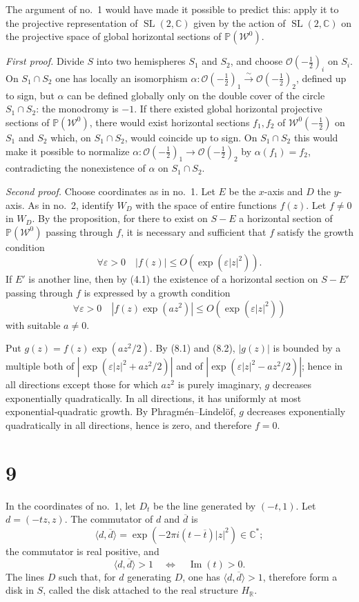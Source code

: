 \documentclass[11pt]{article}
\newcommand{\C}{\mathbb C}
\newcommand{\R}{\mathbb R}
\newcommand{\cO}{\mathcal O}
\newcommand{\cW}{\mathcal W}
\newcommand{\half}{\tfrac12}
\DeclareMathOperator{\SL}{SL}
\begin{document}
The argument of no.~1 would have made it possible to predict this: apply it to the projective representation of $\SL(2,\C)$ given by the action of $\SL(2,\C)$ on the projective space of global horizontal sections of $\mathbb P(\cW^0)$.

\emph{First proof.} Divide $S$ into two hemispheres $S_1$ and $S_2$, and choose $\cO(-\half)_i$ on $S_i$. On $S_1\cap S_2$ one has locally an isomorphism $\alpha:\cO(-\half)_1\xrightarrow{\sim}\cO(-\half)_2$, defined up to sign, but $\alpha$ can be defined globally only on the double cover of the circle $S_1\cap S_2$: the monodromy is $-1$. If there existed global horizontal projective sections of $\mathbb P(\cW^0)$, there would exist horizontal sections $f_1,f_2$ of $\cW^0(-\half)$ on $S_1$ and $S_2$ which, on $S_1\cap S_2$, would coincide up to sign. On $S_1\cap S_2$ this would make it possible to normalize $\alpha:\cO(-\half)_1\to\cO(-\half)_2$ by $\alpha(f_1)=f_2$, contradicting the nonexistence of $\alpha$ on $S_1\cap S_2$.

\emph{Second proof.} Choose coordinates as in no.~1. Let $E$ be the $x$-axis and $D$ the $y$-axis. As in no.~2, identify $W_D$ with the space of entire functions $f(z)$. Let $f\ne0$ in $W_D$. By the proposition, for there to exist on $S-E$ a horizontal section of $\mathbb P(\cW^0)$ passing through $f$, it is necessary and sufficient that $f$ satisfy the growth condition
\begin{equation}\tag{8.1}
\forall\varepsilon>0\quad |f(z)|\le O(\exp(\varepsilon |z|^2)).
\end{equation}
If $E'$ is another line, then by (4.1) the existence of a horizontal section on $S-E'$ passing through $f$ is expressed by a growth condition
\begin{equation}\tag{8.2}
\forall\varepsilon>0\quad |f(z)\exp(az^2)|\le O(\exp(\varepsilon |z|^2))
\end{equation}
with suitable $a\ne0$.

Put $g(z)=f(z)\exp(az^2/2)$. By (8.1) and (8.2), $|g(z)|$ is bounded by a multiple both of $|\exp(\varepsilon |z|^2+az^2/2)|$ and of $|\exp(\varepsilon |z|^2-az^2/2)|$; hence in all directions except those for which $az^2$ is purely imaginary, $g$ decreases exponentially quadratically. In all directions, it has uniformly at most exponential-quadratic growth. By Phragm\'en--Lindel\"of, $g$ decreases exponentially quadratically in all directions, hence is zero, and therefore $f=0$.

\section*{9}
In the coordinates of no.~1, let $D_t$ be the line generated by $(-t,1)$. Let $d=(-tz,z)$. The commutator of $d$ and $\overline d$ is
\[
\langle d,\overline d\rangle=\exp(-2\pi i(t-\overline t)|z|^2)\in\C^*;
\]
the commutator is real positive, and
\[
\langle d,\overline d\rangle>1\quad\Longleftrightarrow\quad \operatorname{Im}(t)>0.
\]
The lines $D$ such that, for $d$ generating $D$, one has $\langle d,\overline d\rangle>1$, therefore form a disk in $S$, called the disk attached to the real structure $H_\R$.
\end{document}
